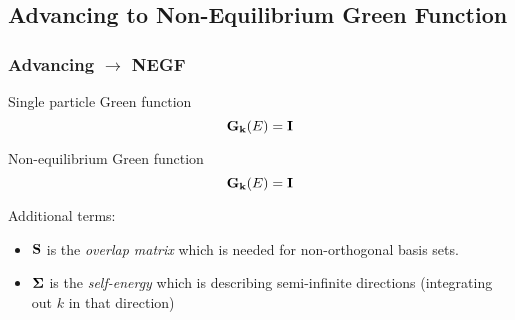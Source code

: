 \subsection{Advancing to Non-Equilibrium Green Function}

\begin{frame}
  \frametitle{Advancing $\to$ NEGF}

  \begin{block}{Single particle Green function}
    \begin{equation*}
      [(E+\im\eta)\ID - \HH_\kk]\G_\kk(E) = \ID
    \end{equation*}
  \end{block}

  \begin{block}{Non-equilibrium Green function}
    \begin{equation*}
      [(E+\im\eta)\SO - \HH_\kk - \sum_\idxE \SE_{\idxE,\kk}(E-\mu_\idxE)]\G_\kk(E) = \ID
    \end{equation*}

    Additional terms:
    \begin{itemize}
      \item%
      $\mathbf{S}$ is the \emph{overlap matrix} which is needed for non-orthogonal basis sets.

      \item%
      $\boldsymbol{\Sigma}$ is the \emph{self-energy} which is describing semi-infinite directions
      (integrating out $k$ in that direction)

    \begin{center}
      
      \begin{columns}

\end{columns}
\end{center}
\end{itemize}
\end{block}
\end{frame}
